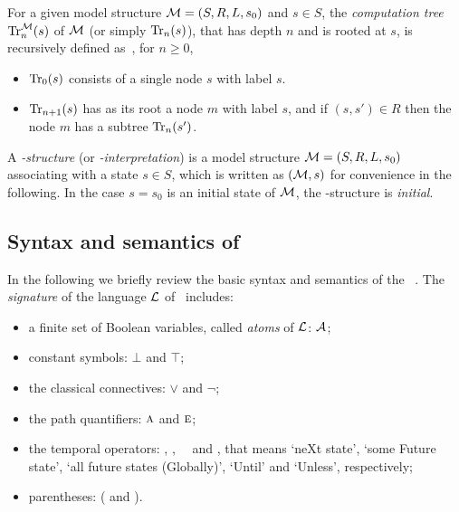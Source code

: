 \documentclass[letterpaper]{article} %
\begin{document}
For a given model structure ${\cal M}=(S,R,L,s_0)$ and $s\in S$,
the {\em computation tree}
$\textrm{Tr}_n^{\cal M}(s)$ of $\cal M$ (or simply $\textrm{Tr}_n(s)$), that has depth $n$ and is rooted at $s$, is recursively defined as~\cite{DBLP:journals/tcs/BrowneCG88}, for $n\ge 0$,
\begin{itemize}
  \item $\textrm{Tr}_0(s)$ consists of a single node $s$ with label $s$.
  \item $\textrm{Tr}_{n+1}(s)$ has as its root a node $m$ with label  $s$, and
  if $(s,s')\in R$ then the node $m$ has a subtree $\textrm{Tr}_n(s')$.
\end{itemize}

A {\em \MPK-structure} (or {\em \MPK-interpretation}) is a model structure
${\cal M}=(S, R, L, s_0)$ associating
with a state $s\in S$, which is written as $({\cal M},s)$ for convenience in the following.
In the case $s=s_0$ is an initial state of $\cal M$, the \MPK-structure is {\em initial}.



\subsection{Syntax and semantics of \CTL}
In the following we briefly review the basic syntax and semantics
of the \CTL~\cite{DBLP:journals/toplas/ClarkeES86}.
The {\em signature} of the language $\cal L$ of \CTL\ includes:
\begin{itemize}
  \item a finite set of Boolean variables, called {\em atoms} of $\cal L$: $\cal A$;
  \item constant symbols: $\bot$ and $\top$;
  \item the classical connectives: $\lor$ and $\neg$;
  \item the path quantifiers: $\textsc{a}$ and $\textsc{e}$;
  \item the temporal operators: \NEXT, \FUTURE, \GLOBAL\, \UNTIL\ and \UNLESS, that
  means `neXt state', `some Future state', `all future states (Globally)', `Until' and `Unless', respectively;
  \item parentheses: ( and ).
\end{itemize}
\end{document}
